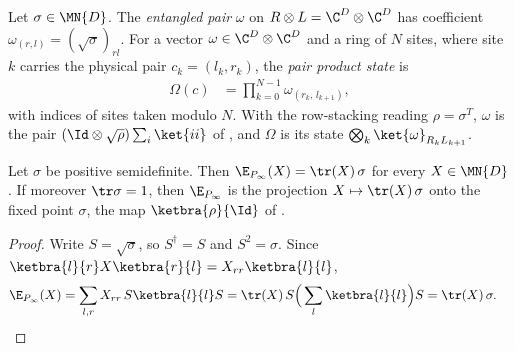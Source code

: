 \begin{definition}
    \label{def:prep_pair_product_state}
    \leanok
    Let $\sigma\in\MN{D}$. The \emph{entangled pair} $\omega$ on
    $R\otimes L=\C^D\otimes\C^D$ has coefficient
    $\omega_{(r,l)}=(\sqrt\sigma)_{rl}$. For a vector
    $\omega\in\C^D\otimes\C^D$ and a ring of $N$ sites, where site $k$
    carries the physical pair $c_k=(l_k,r_k)$, the \emph{pair product
        state} is
    \begin{align}
        \Omega(c)
         & =\prod_{k=0}^{N-1}\omega_{(r_k,\,l_{k+1})},
        \label{eq:prep_pair_product}
    \end{align}
    with indices of sites taken modulo $N$. With the row-stacking
    reading $\rho=\sigma^T$, $\omega$ is the pair
    $(\Id\otimes\sqrt\rho)\sum_i\ket{ii}$ of \cite{Malz2024Preparation},
    and $\Omega$ is its state $\bigotimes_k\ket{\omega}_{R_kL_{k+1}}$.
\end{definition}

\begin{theorem}
    \label{thm:prep_transfer_fixed_point_tensor}
    \leanok
    Let $\sigma$ be positive semidefinite. Then
    $\E_{P_\infty}(X)=\tr(X)\,\sigma$ for every $X\in\MN{D}$. If moreover
    $\tr\sigma=1$, then $\E_{P_\infty}$ is the projection
    $X\mapsto\tr(X)\,\sigma$ onto the fixed point $\sigma$, the map
    $\ketbra{\rho}{\Id}$ of \cite{Malz2024Preparation}.
\end{theorem}
\begin{proof}
    \leanok
    Write $S=\sqrt\sigma$, so $S^\dagger=S$ and $S^2=\sigma$. Since
    $\ketbra{l}{r}X\ketbra{r}{l}=X_{rr}\ketbra{l}{l}$,
    \begin{align}
        \E_{P_\infty}(X)
         & =\sum_{l,r}X_{rr}\,S\ketbra{l}{l}S
        =\tr(X)\,S\Big(\sum_l\ketbra{l}{l}\Big)S
        =\tr(X)\,\sigma.
        \notag
    \end{align}
\end{proof}

